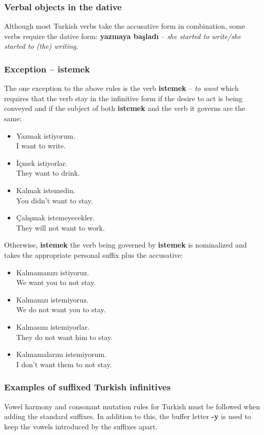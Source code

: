 \subsubsection{Verbal objects in the dative}
Although most Turkish verbs take the accusative form in combination, some
verbs require the dative form: \textbf{yazmaya başladı} -- \emph{she
  started to write/she started to (the) writing}.

\subsubsection{Exception -- istemek}
The one exception to the above rules is the verb \textbf{istemek} --
\emph{to want} which requires that the verb stay in the infinitive form if
the desire to act is being conveyed and if the subject of both
\textbf{istemek} and the verb it governs are the same:
\begin{itemize}
\item Yazmak istiyorum.\\
  I want to write.
\item İçmek istiyorlar.\\
  They want to drink.
\item Kalmak istemedin.\\
  You didn't want to stay.
\item Çalışmak istemeyecekler.\\
  They will not want to work.
\end{itemize}

Otherwise, \textbf{istemek} the verb being governed by \textbf{istemek} is
nominalized and takes the appropriate personal suffix plus the accusative:
\begin{itemize}
\item Kalmamanızı istiyoruz.\\
  We want you to not stay.
\item Kalmanızı istemiyoruz.\\
  We do not want you to stay.
\item Kalmasını istemiyorlar.\\
  They do not want him to stay.
\item Kalmamalarını istemiyorum.\\
  I don't want them to not stay.
\end{itemize}

\subsubsection{Examples of suffixed Turkish infinitives}
Vowel harmony and consonant mutation rules for Turkish must be followed
when adding the standard suffixes. In addition to this, the buffer letter
\textbf{-y} is used to keep the vowels introduced by the suffixes apart.

